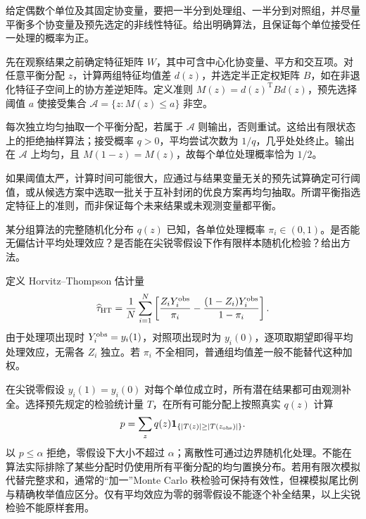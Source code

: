 \documentclass[UTF8,12pt,a4paper,fontset=fandol]{ctexbook}
\begin{document}
\begin{example}[原题5：保持随机性的协变量平衡算法]\label{yau:2021-5}
给定偶数个单位及其固定协变量，要把一半分到处理组、一半分到对照组，并尽量平衡多个协变量及预先选定的非线性特征。给出明确算法，且保证每个单位接受任一处理的概率为正。
\end{example}
\begin{solve}
先在观察结果之前确定特征矩阵 $W$，其中可含中心化协变量、平方和交互项。对任意平衡分配 $z$，计算两组特征均值差 $d(z)$，并选定半正定权矩阵 $B$，如在非退化特征子空间上的协方差逆矩阵。定义准则 $M(z)=d(z)^{\mathrm T}Bd(z)$，预先选择阈值 $a$ 使接受集合 $\mathcal A=\{z:M(z)\le a\}$ 非空。

每次独立均匀抽取一个平衡分配，若属于 $\mathcal A$ 则输出，否则重试。这给出有限状态上的拒绝抽样算法；接受概率 $q>0$，平均尝试次数为 $1/q$，几乎处处终止。输出在 $\mathcal A$ 上均匀，且 $M(1-z)=M(z)$，故每个单位处理概率恰为 $1/2$。

如果阈值太严，计算时间可能很大，应通过与结果变量无关的预先试算确定可行阈值，或从候选方案中选取一批关于互补封闭的优良方案再均匀抽取。所谓平衡指选定特征上的准则，而非保证每个未来结果或未观测变量都平衡。
\end{solve}

\begin{example}[原题6：已知随机化机制下的估计与精确检验]\label{yau:2021-6}
某分组算法的完整随机化分布 $q(z)$ 已知，各单位处理概率 $\pi_i\in(0,1)$。是否能无偏估计平均处理效应？是否能在尖锐零假设下作有限样本随机化检验？给出方法。
\end{example}
\begin{solve}
定义 Horvitz--Thompson 估计量
\[
\widehat\tau_{\rm HT}=\frac1N\sum_{i=1}^N\left[\frac{Z_iY_i^{\rm obs}}{\pi_i}-\frac{(1-Z_i)Y_i^{\rm obs}}{1-\pi_i}\right].
\]
由于处理项出现时 $Y_i^{\rm obs}=y_i(1)$，对照项出现时为 $y_i(0)$，逐项取期望即得平均处理效应，无需各 $Z_i$ 独立。若 $\pi_i$ 不全相同，普通组均值差一般不能替代这种加权。

在尖锐零假设 $y_i(1)=y_i(0)$ 对每个单位成立时，所有潜在结果都可由观测补全。选择预先规定的检验统计量 $T$，在所有可能分配上按照真实 $q(z)$ 计算
\[
p=\sum_zq(z)\mathbf1_{\{|T(z)|\ge|T(z_{\rm obs})|\}}.
\]
以 $p\le\alpha$ 拒绝，零假设下大小不超过 $\alpha$；离散性可通过边界随机化处理。不能在算法实际排除了某些分配时仍使用所有平衡分配的均匀置换分布。若用有限次模拟代替完整求和，通常的“加一”Monte Carlo 秩检验可保持有效性，但裸模拟尾比例与精确枚举值应区分。仅有平均效应为零的弱零假设不能逐个补全结果，以上尖锐检验不能原样套用。
\end{solve}
\end{document}
